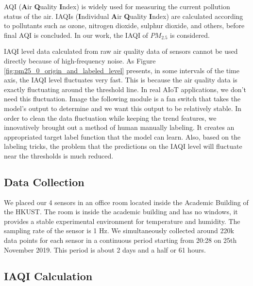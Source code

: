 \documentclass[
twocolumn,
]{ceurart}
\begin{document}
AQI (\textbf{A}ir \textbf{Q}uality \textbf{I}ndex) is widely used for measuring the current pollution status of the air. IAQIs (\textbf{I}ndividual \textbf{A}ir \textbf{Q}uality \textbf{I}ndex) are calculated according to pollutants such as ozone, nitrogen dioxide, sulphur dioxide, and others, before final AQI is concluded. In our work, the IAQI of $PM_{2.5}$ is considered.

IAQI level data calculated from raw air quality data of sensors cannot be used directly because of high-frequency noise. As Figure \ref{fig:pm25_0_origin_and_labeled_level} presents, in some intervals of the time axis, the IAQI level fluctuates very fast. This is because the air quality data is exactly fluctuating around the threshold line. In real AIoT applications, we don't need this fluctuation. Image the following module is a fan switch that takes the model's output to determine and we want this output to be relatively stable. In order to clean the data fluctuation while keeping the trend features, we innovatively brought out a method of human manually labeling. It creates an appropriated target label function that the model can learn. Also, based on the labeling tricks, the problem that the predictions on the IAQI level will fluctuate near the thresholds is much reduced.

\subsection{Data Collection}

We placed our 4 sensors in an office room located inside the Academic Building of the HKUST. The room is inside the academic building and has no windows, it provides a stable experimental environment for temperature and humidity. The sampling rate of the sensor is 1 Hz. We simultaneously collected around 220k data points for each sensor in a continuous period starting from 20:28 on 25th November 2019. This period is about 2 days and a half or 61 hours.

\subsection{IAQI Calculation}
\end{document}
